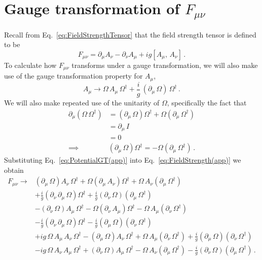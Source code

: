 \section{Gauge transformation of $F_{\mu\nu}$}\label{app:GTF}
Recall from Eq.~\eqref{eq:FieldStrengthTensor} that the field strength tensor is defined to be
%
\begin{equation}
F_{\mu\nu}=\partial_\mu A_\nu - \partial_\nu A_\mu + ig[A_\mu,\,A_\nu]\, .
\label{eq:FieldStrength(app)}
\end{equation}
%
To calculate how $F_{\mu\nu}$ transforms under a gauge transformation, we will also make use of the gauge transformation property for $A_\mu$,
%
\begin{equation}
A_\mu \rightarrow \Omega\,A_\mu\,\Omega^\dag + \frac{i}{g}\,(\partial_\mu\,\Omega)\,\Omega^\dag\, . 
\label{eq:PotentialGT(app)}
\end{equation}
%
We will also make repeated use of the unitarity of $\Omega$, specifically the fact that
%
\begin{align}
\partial_\mu \left(\Omega\, \Omega^\dagger\right) &= \left(\partial_\mu\,\Omega\right)\Omega^\dagger + \Omega\left(\partial_\mu\, \Omega^\dagger\right)\nonumber\\
&=\partial_\mu \, I\nonumber\\
&= 0\nonumber\\
\implies & \left(\partial_\mu\,\Omega\right)\Omega^\dagger = -\Omega\left(\partial_\mu\, \Omega^\dagger\right)\, .
\end{align}
%
Substituting Eq.~\eqref{eq:PotentialGT(app)} into Eq.~\eqref{eq:FieldStrength(app)} we obtain
%
\begin{align}
F_{\mu\nu} \rightarrow &\left(\partial_\mu \, \Omega\right)A_\nu \, \Omega^\dagger + \Omega\left(\partial_\mu\,A_\nu\right)\Omega^\dagger + \Omega \, A_\nu\left(\partial_\mu \, \Omega^\dagger\right)\nonumber\\
& + \frac{i}{g}\left(\partial_\nu\,\partial_\mu\, \Omega\right)\Omega^\dagger + \frac{i}{g}\left(\partial_\nu\,\Omega\right)\left(\partial_\mu\,\Omega^\dagger\right)\nonumber\\
& - \left(\partial_\nu \, \Omega\right)A_\mu \, \Omega^\dagger - \Omega\left(\partial_\nu\,A_\mu\right)\Omega^\dagger - \Omega \, A_\mu\left(\partial_\nu \, \Omega^\dagger\right)\nonumber\\
& - \frac{i}{g}\left(\partial_\nu\,\partial_\mu\, \Omega\right)\Omega^\dagger - \frac{i}{g}\left(\partial_\mu\,\Omega\right)\left(\partial_\nu\,\Omega^\dagger\right)\nonumber\\
& +ig \, \Omega \, A_\mu \, A_\nu \, \Omega^\dagger - \left(\partial_\mu \, \Omega\right)A_\nu \, \Omega^\dagger + \Omega\,A_\mu\left(\partial_\nu \, \Omega^\dagger\right) + \frac{i}{g}\left(\partial_\mu\,\Omega\right)\left(\partial_\nu\,\Omega^\dagger\right)\nonumber\\
& -ig \, \Omega \, A_\nu \, A_\mu \, \Omega^\dagger + \left(\partial_\nu \, \Omega\right)A_\mu \, \Omega^\dagger - \Omega\,A_\nu\left(\partial_\mu \, \Omega^\dagger\right) - \frac{i}{g}\left(\partial_\nu\,\Omega\right)\left(\partial_\mu\,\Omega^\dagger\right)\, . 
\end{align}
